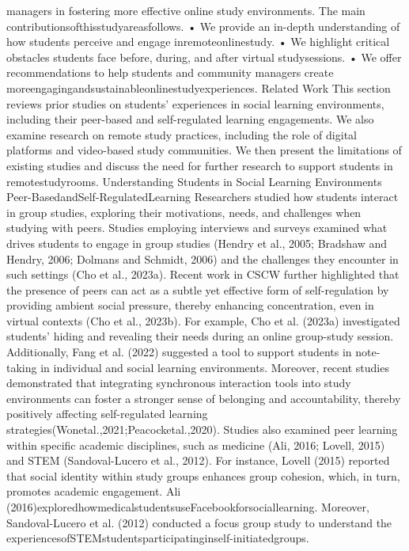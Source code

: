 \documentclass[12pt]{ctexart}
\begin{document}
managers in fostering more effective online study environments. The main
contributionsofthisstudyareasfollows.
• We provide an in-depth understanding of how students perceive and engage
inremoteonlinestudy.
• We highlight critical obstacles students face before, during, and after virtual
studysessions.
• We offer recommendations to help students and community managers create
moreengagingandsustainableonlinestudyexperiences.
Related Work
This section reviews prior studies on students’ experiences in social learning
environments, including their peer-based and self-regulated learning engagements.
We also examine research on remote study practices, including the role of digital
platforms and video-based study communities. We then present the limitations of
existing studies and discuss the need for further research to support students in
remotestudyrooms.
Understanding Students in Social Learning Environments
Peer-BasedandSelf-RegulatedLearning
Researchers studied how students interact in group studies, exploring their
motivations, needs, and challenges when studying with peers. Studies employing
interviews and surveys examined what drives students to engage in group
studies (Hendry et al., 2005; Bradshaw and Hendry, 2006; Dolmans and Schmidt,
2006) and the challenges they encounter in such settings (Cho et al., 2023a).
Recent work in CSCW further highlighted that the presence of peers can act as a
subtle yet effective form of self-regulation by providing ambient social pressure,
thereby enhancing concentration, even in virtual contexts (Cho et al., 2023b). For
example, Cho et al. (2023a) investigated students’ hiding and revealing their needs
during an online group-study session. Additionally, Fang et al. (2022) suggested a
tool to support students in note-taking in individual and social learning
environments. Moreover, recent studies demonstrated that integrating synchronous
interaction tools into study environments can foster a stronger sense of belonging
and accountability, thereby positively affecting self-regulated learning
strategies(Wonetal.,2021;Peacocketal.,2020).
Studies also examined peer learning within specific academic disciplines, such
as medicine (Ali, 2016; Lovell, 2015) and STEM (Sandoval-Lucero et al., 2012).
For instance, Lovell (2015) reported that social identity within study groups
enhances group cohesion, which, in turn, promotes academic engagement. Ali
(2016)exploredhowmedicalstudentsuseFacebookforsociallearning. Moreover,
Sandoval-Lucero et al. (2012) conducted a focus group study to understand the
experiencesofSTEMstudentsparticipatinginself-initiatedgroups.
\end{document}
